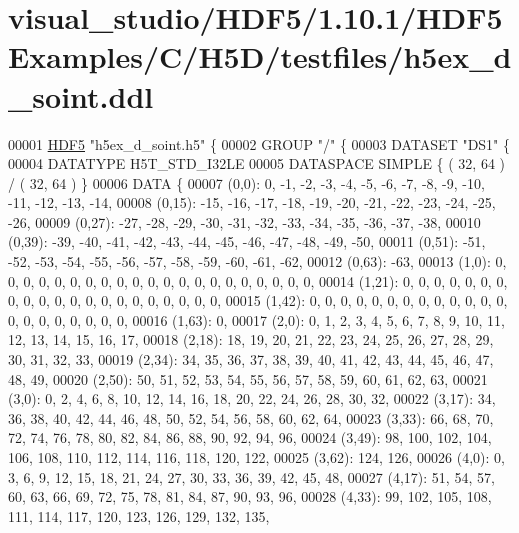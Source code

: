 \hypertarget{visual__studio_2_h_d_f5_21_810_81_2_h_d_f5_examples_2_c_2_h5_d_2testfiles_2h5ex__d__soint_8ddl_source}{}\section{visual\+\_\+studio/\+H\+D\+F5/1.10.1/\+H\+D\+F5\+Examples/\+C/\+H5\+D/testfiles/h5ex\+\_\+d\+\_\+soint.ddl}
\label{visual__studio_2_h_d_f5_21_810_81_2_h_d_f5_examples_2_c_2_h5_d_2testfiles_2h5ex__d__soint_8ddl_source}

\begin{DoxyCode}
00001 \hyperlink{namespace_h_d_f5}{HDF5} \textcolor{stringliteral}{"h5ex\_d\_soint.h5"} \{
00002 GROUP \textcolor{stringliteral}{"/"} \{
00003    DATASET \textcolor{stringliteral}{"DS1"} \{
00004       DATATYPE  H5T\_STD\_I32LE
00005       DATASPACE  SIMPLE \{ ( 32, 64 ) / ( 32, 64 ) \}
00006       DATA \{
00007       (0,0): 0, -1, -2, -3, -4, -5, -6, -7, -8, -9, -10, -11, -12, -13, -14,
00008       (0,15): -15, -16, -17, -18, -19, -20, -21, -22, -23, -24, -25, -26,
00009       (0,27): -27, -28, -29, -30, -31, -32, -33, -34, -35, -36, -37, -38,
00010       (0,39): -39, -40, -41, -42, -43, -44, -45, -46, -47, -48, -49, -50,
00011       (0,51): -51, -52, -53, -54, -55, -56, -57, -58, -59, -60, -61, -62,
00012       (0,63): -63,
00013       (1,0): 0, 0, 0, 0, 0, 0, 0, 0, 0, 0, 0, 0, 0, 0, 0, 0, 0, 0, 0, 0, 0,
00014       (1,21): 0, 0, 0, 0, 0, 0, 0, 0, 0, 0, 0, 0, 0, 0, 0, 0, 0, 0, 0, 0, 0,
00015       (1,42): 0, 0, 0, 0, 0, 0, 0, 0, 0, 0, 0, 0, 0, 0, 0, 0, 0, 0, 0, 0, 0,
00016       (1,63): 0,
00017       (2,0): 0, 1, 2, 3, 4, 5, 6, 7, 8, 9, 10, 11, 12, 13, 14, 15, 16, 17,
00018       (2,18): 18, 19, 20, 21, 22, 23, 24, 25, 26, 27, 28, 29, 30, 31, 32, 33,
00019       (2,34): 34, 35, 36, 37, 38, 39, 40, 41, 42, 43, 44, 45, 46, 47, 48, 49,
00020       (2,50): 50, 51, 52, 53, 54, 55, 56, 57, 58, 59, 60, 61, 62, 63,
00021       (3,0): 0, 2, 4, 6, 8, 10, 12, 14, 16, 18, 20, 22, 24, 26, 28, 30, 32,
00022       (3,17): 34, 36, 38, 40, 42, 44, 46, 48, 50, 52, 54, 56, 58, 60, 62, 64,
00023       (3,33): 66, 68, 70, 72, 74, 76, 78, 80, 82, 84, 86, 88, 90, 92, 94, 96,
00024       (3,49): 98, 100, 102, 104, 106, 108, 110, 112, 114, 116, 118, 120, 122,
00025       (3,62): 124, 126,
00026       (4,0): 0, 3, 6, 9, 12, 15, 18, 21, 24, 27, 30, 33, 36, 39, 42, 45, 48,
00027       (4,17): 51, 54, 57, 60, 63, 66, 69, 72, 75, 78, 81, 84, 87, 90, 93, 96,
00028       (4,33): 99, 102, 105, 108, 111, 114, 117, 120, 123, 126, 129, 132, 135,

\end{DoxyCode}
